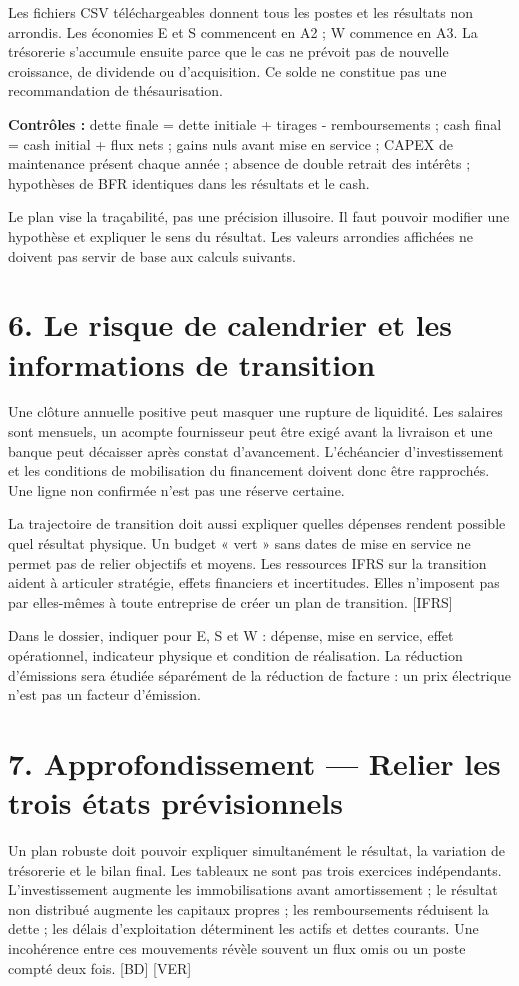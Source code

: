 \documentclass[12pt,a4paper]{article}
\begin{document}
Les fichiers CSV téléchargeables donnent tous les postes et les résultats non arrondis. Les économies E et S commencent en A2 ; W commence en A3. La trésorerie s’accumule ensuite parce que le cas ne prévoit pas de nouvelle croissance, de dividende ou d’acquisition. Ce solde ne constitue pas une recommandation de thésaurisation.


\textbf{Contrôles :} dette finale = dette initiale + tirages - remboursements ; cash final = cash initial + flux nets ; gains nuls avant mise en service ; CAPEX de maintenance présent chaque année ; absence de double retrait des intérêts ; hypothèses de BFR identiques dans les résultats et le cash.


Le plan vise la traçabilité, pas une précision illusoire. Il faut pouvoir modifier une hypothèse et expliquer le sens du résultat. Les valeurs arrondies affichées ne doivent pas servir de base aux calculs suivants.

\section*{6. Le risque de calendrier et les informations de transition}
Une clôture annuelle positive peut masquer une rupture de liquidité. Les salaires sont mensuels, un acompte fournisseur peut être exigé avant la livraison et une banque peut décaisser après constat d’avancement. L’échéancier d’investissement et les conditions de mobilisation du financement doivent donc être rapprochés. Une ligne non confirmée n’est pas une réserve certaine.


La trajectoire de transition doit aussi expliquer quelles dépenses rendent possible quel résultat physique. Un budget « vert » sans dates de mise en service ne permet pas de relier objectifs et moyens. Les ressources IFRS sur la transition aident à articuler stratégie, effets financiers et incertitudes. Elles n’imposent pas par elles-mêmes à toute entreprise de créer un plan de transition. [IFRS]


Dans le dossier, indiquer pour E, S et W : dépense, mise en service, effet opérationnel, indicateur physique et condition de réalisation. La réduction d’émissions sera étudiée séparément de la réduction de facture : un prix électrique n’est pas un facteur d’émission.

\section*{7. Approfondissement --- Relier les trois états prévisionnels}
Un plan robuste doit pouvoir expliquer simultanément le résultat, la variation de trésorerie et le bilan final. Les tableaux ne sont pas trois exercices indépendants. L’investissement augmente les immobilisations avant amortissement ; le résultat non distribué augmente les capitaux propres ; les remboursements réduisent la dette ; les délais d’exploitation déterminent les actifs et dettes courants. Une incohérence entre ces mouvements révèle souvent un flux omis ou un poste compté deux fois. [BD] [VER]
\end{document}
